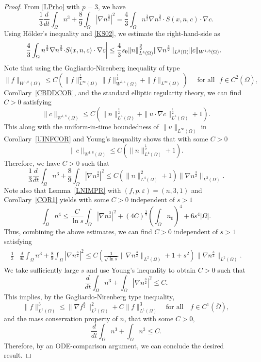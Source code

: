 \documentclass{amsart}
\numberwithin{equation}{section}
\newcommand{\bke}[1]{\left( #1 \right)}
\begin{document}
\begin{proof}
From \eqref{LPrho} with $p=3$, we have
\[
\frac{1}{3}\frac{d}{dt}\int_{\Omega}n^{3}+\frac{8}{9}\int_{\Omega} |\nabla n^{\frac{3}{2}} |^{2}=\frac{4}{3}\int_{\Omega}n^{\frac{3}{2}}\nabla n^{\frac{3}{2}}\cdot  S(x,n,c)\cdot \nabla c.
\]
Using  H\"older's inequality and \eqref{KS02}, we estimate the right-hand-side as
\begin{align*}
\begin{aligned}
\biggr{|}\frac{4}{3}\int_{\Omega}n^{\frac{3}{2}}\nabla n^{\frac{3}{2}} \cdot & S(x,n,c)\cdot \nabla c \biggr{|}
\le \frac{4}{3}s_{0}\|n\|_{L^{4}(\Omega)}^{\frac{3}{2}}\|   \nabla n^{\frac{3}{2}} \|_{L^{2}(\Omega)}\|c\|_{W^{1,8}(\Omega)}.
\end{aligned}
\end{align*}
Note that using the Gagliardo-Nirenberg inequality of type
\[
\|f\|_{W^{1,8}(\Omega)} \le C(\|f\|_{L^{\infty}(\Omega)}^{\frac{1}{2}}\|f\|_{W^{2,4}(\Omega)}^{\frac{1}{2}}+\|f\|_{L^{\infty}(\Omega)})\quad\mbox{ for all }\,\, f\in C^{2}(\overline{\Omega}),
\]
Corollary~\ref {CBDDCOR}, and the standard elliptic regularity theory,  we can find $C>0$ satisfying
\[
\|c\|_{W^{1,8}(\Omega)}\le C (\|n \|_{L^{4}(\Omega)}^{\frac{1}{2}}+\|u\cdot \nabla c\|_{L^{4}(\Omega)}^{\frac{1}{2}} + 1 ).
\]
This along with the uniform-in-time boundedness of $\|u\|_{L^{\infty}(\Omega)}$ in Corollary~\ref{UINFCOR} and Young's inequality shows that with some $C>0$
\[
\|c\|_{W^{1,8}(\Omega)}\le C (\|n \|_{L^{4}(\Omega)}^{\frac{1}{2}}+1).
\]
Therefore, we have $C>0$ such that 
\[
\frac{1}{3}\frac{d}{dt}\int_{\Omega}n^{3}+\frac{8}{9}\int_{\Omega} |\nabla n^{\frac{3}{2}} |^{2} \leq C \left( \|n\|_{L^{4}(\Omega)}^{2} + 1\right)  \|\nabla n^{\frac{3}{2}} \|_{L^{2}(\Omega)}.
\]
Note also that Lemma~\ref{LNIMPR} with $(f,p,\varepsilon)=(n,3,1)$ and Corollary~\ref{COR1} yields with some $C>0$ independent of $s>1$
\[
\int_{\Omega} n^{4}
 \le  \frac{C}{\ln s} \int_{\Omega} |\nabla n^{\frac{3}{2}}|^{2} + (4C)^{\frac{3}{2}}\bke{\int_{\Omega}n_{0}}^{4}+6s^{4}|\Omega|.
\]
Thus, combining the above estimates, we can find $C >0$  independent of $s>1$ satisfying
\begin{align*}
\begin{aligned}
\frac{1}{3}&\frac{d}{dt}\int_{\Omega}n^{3}+\frac{8}{9}\int_{\Omega} |\nabla n^{\frac{3}{2}} |^{2}
\le C \bke{ \frac{1}{\sqrt{\ln s}}\|   \nabla n^{\frac{3}{2}} \|_{L^{2}(\Omega)}+1+s^{2} }\|   \nabla n^{\frac{3}{2}} \|_{L^{2}(\Omega)}.
\end{aligned}
\end{align*}
We take sufficiently large $s$ and use Young's inequality to obtain $C>0$ such that
\[
 \frac{d}{dt}\int_{\Omega}n^{3}+ \int_{\Omega} |\nabla n^{\frac{3}{2}} |^{2}\le C.
\]
This implies, by the Gagliardo-Nirenberg type inequality,
\[
\|f\|_{L^{3}(\Omega)}^{3}\le \|\nabla f^{\frac{3}{2}}\|_{L^{2}(\Omega)}^{2}+C\|f\|_{L^{1}(\Omega)}^{3}\quad\mbox{for all}\quad f\in C^{1}(\overline{\Omega}),
\] 
and the mass conservation property of $n$, that with some $C>0$,
\[
 \frac{d}{dt}\int_{\Omega}n^{3}+\int_{\Omega}n^{3}\le C.
\]
Therefore, by an ODE-comparison argument, we can conclude the desired result.
\end{proof}  
\end{document}
